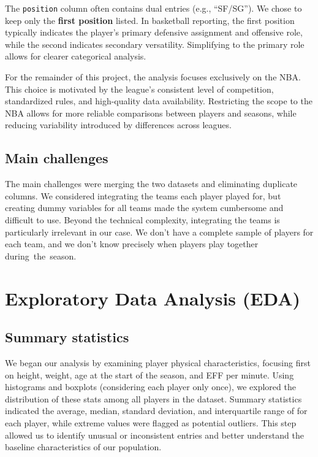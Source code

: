 \documentclass[
  letterpaper,
  DIV=11,
  numbers=noendperiod]{scrartcl}
\begin{document}
The \texttt{position} column often contains dual entries (e.g.,
``SF/SG''). We chose to keep only the \textbf{first position} listed. In
basketball reporting, the first position typically indicates the
player's primary defensive assignment and offensive role, while the
second indicates secondary versatility. Simplifying to the primary role
allows for clearer categorical analysis.

For the remainder of this project, the analysis focuses exclusively on
the NBA. This choice is motivated by the league's consistent level of
competition, standardized rules, and high-quality data availability.
Restricting the scope to the NBA allows for more reliable comparisons
between players and seasons, while reducing variability introduced by
differences across leagues.

\subsection{Main challenges}\label{main-challenges}

The main challenges were merging the two datasets and eliminating
duplicate columns. We considered integrating the teams each player
played for, but creating dummy variables for all teams made the system
cumbersome and difficult to use. Beyond the technical complexity,
integrating the teams is particularly irrelevant in our case. We don't
have a complete sample of players for each team, and we don't know
precisely when players play together during~the~season.

\section{Exploratory Data Analysis
(EDA)}\label{exploratory-data-analysis-eda}

\subsection{Summary statistics}\label{summary-statistics}

We began our analysis by examining player physical characteristics,
focusing first on height, weight, age at the start of the season, and
EFF per minute. Using histograms and boxplots (considering each player
only once), we explored the distribution of these stats among all
players in the dataset. Summary statistics indicated the average,
median, standard deviation, and interquartile range of for each player,
while extreme values were flagged as potential outliers. This step
allowed us to identify unusual or inconsistent entries and better
understand the baseline characteristics of our population.
\end{document}
